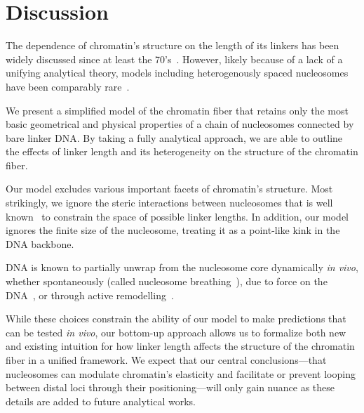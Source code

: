 \documentclass[%
 reprint,
superscriptaddress,
showpacs,preprintnumbers,
 amsmath,amssymb,
 aps,
 prl,
]{revtex4-1}
\begin{document}
\section{\label{sec:discussion}Discussion}

The dependence of chromatin's structure on the length of its linkers has been
    widely discussed since at least the 70's~\cite{finch1976}.
However, likely because of a lack of a unifying analytical theory, models
    including heterogenously spaced nucleosomes have been comparably
    rare~\cite{woodcock1993,collepardo-guevara2014}.

We present a simplified model of the chromatin fiber that retains only the most
    basic geometrical and physical properties of a chain of nucleosomes
    connected by bare linker DNA.\@
By taking a fully analytical approach, we are able to outline the effects of
    linker length and its heterogeneity on the structure of the chromatin fiber.

Our model excludes various important facets of chromatin's structure.
Most strikingly, we ignore the steric interactions between nucleosomes that is
    well known~\cite{widom1992} to constrain the space of possible linker
    lengths.
In addition, our model ignores the finite size of the nucleosome, treating it as
    a point-like kink in the DNA backbone.

DNA is known to partially unwrap from the nucleosome core dynamically \textit{in
    vivo}, whether spontaneously (called nucleosome breathing~\cite{TODO}), due to
    force on the DNA~\cite{TODO}, or through active
    remodelling~\cite{dion2007,kulaeva2007,senavirathne2017}.

While these choices constrain the ability of our model to make predictions that
    can be tested \textit{in vivo}, our bottom-up approach allows us to
    formalize both new and existing intuition for how linker length affects the
    structure of the chromatin fiber in a unified framework.
We expect that our central conclusions---that nucleosomes can modulate
    chromatin's elasticity and facilitate or prevent looping between distal loci
    through their positioning---will only gain nuance as these details are added
    to future analytical works.
\end{document}
